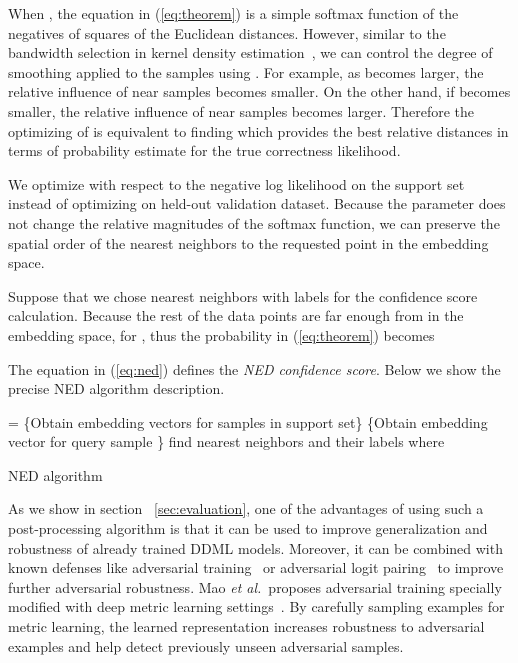 \documentclass{article}
\newcommand{\numclassessupport}{\ensuremath{{M_{support}}}}
\begin{document}
When , the equation in (\ref{eq:theorem}) is a simple softmax function of the negatives of squares of the Euclidean distances.
However, similar to the bandwidth selection in kernel density estimation~\cite{b64},
we can control the degree of smoothing applied to the samples using .
For example, as  becomes larger, the relative influence of near samples becomes smaller.
On the other hand, if  becomes smaller, the relative influence of near samples becomes larger.
Therefore the optimizing of  is equivalent to finding  which
provides the best relative distances
in terms of probability estimate for the true correctness likelihood.


We optimize  with respect to the negative log likelihood on the support set instead of optimizing on held-out validation dataset. Because the parameter  does
not change the relative magnitudes of the softmax function, we can preserve the spatial order of the nearest neighbors to the requested point  in the embedding space.

Suppose that we chose   nearest neighbors with labels  for the confidence score calculation.
Because the rest of the data points are far enough from  in the embedding space,
 for ,
thus the probability in (\ref{eq:theorem}) becomes


The equation in (\ref{eq:ned}) defines the \emph{NED confidence score}.
Below we show the precise NED algorithm description.

\IncMargin{1em}
\begin{algorithm}[H]
	\SetAlgoLined
	\BlankLine
	 =    \{Obtain embedding vectors for samples in support set\}\;
	 \{Obtain embedding vector for query sample \}\;
	find  nearest neighbors  and their labels \;
	\For{ \KwTo \numclassessupport}{
		\;
	}
	\;
	 where \;
	\Return{, }
	\caption{NED algorithm}
	\label{alg:ned}
\end{algorithm}\DecMargin{1em}

As we show in section ~\ref{sec:evaluation}, one of the advantages of using such a post-processing algorithm is that it can be used to improve generalization and robustness of already trained DDML models. Moreover, it can be combined with known defenses like adversarial training~\cite{b53} or adversarial logit pairing~\cite{b55} to improve further adversarial robustness. Mao \textit{et al.}\ proposes adversarial training specially modified with deep metric learning settings~\cite{b56}. By carefully sampling examples for metric learning, the learned representation increases robustness to adversarial examples and help detect previously unseen adversarial samples.
\end{document}
